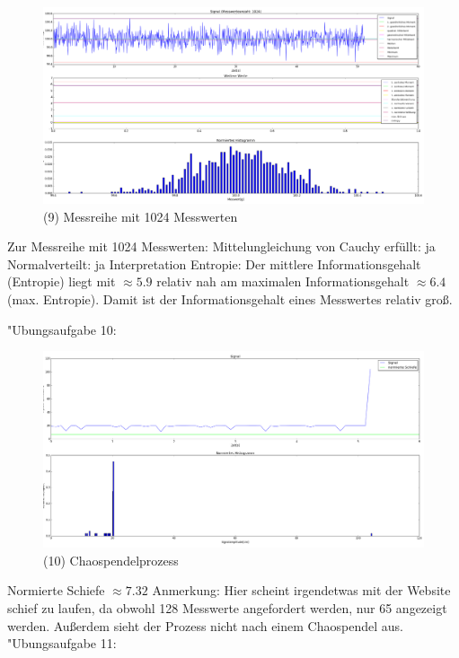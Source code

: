 \documentclass[fleqn,a4paper,12pt]{article}
\begin{document}
  \begin{figure}
    \includegraphics[width=1.0\textwidth]{a9_1024.png}
    \caption{(9) Messreihe mit 1024 Messwerten}
  \end{figure}
  Zur Messreihe mit 1024 Messwerten: \newline
  Mittelungleichung von Cauchy erfüllt: ja \newline
  Normalverteilt: ja \newline
  Interpretation Entropie: Der mittlere Informationsgehalt (Entropie) liegt mit $\approx 5.9$ relativ nah am maximalen Informationsgehalt $\approx 6.4$ (max. Entropie).
  Damit ist der Informationsgehalt eines Messwertes relativ groß. \newpage

  "Ubungsaufgabe 10: \newline
  \begin{figure}
    \includegraphics[width=1.0\textwidth]{a10.png}
    \caption{(10) Chaospendelprozess}
  \end{figure}
  Normierte Schiefe $\approx 7.32$ \newline
  Anmerkung: Hier scheint irgendetwas mit der Website schief zu laufen, da obwohl 128 Messwerte angefordert werden, nur 65 angezeigt werden.
  Außerdem sieht der Prozess nicht nach einem Chaospendel aus.
\newpage
  "Ubungsaufgabe 11:\newline
\end{document}
